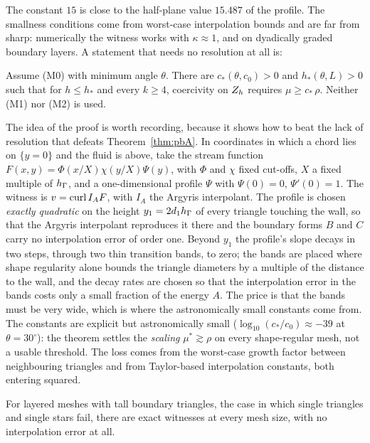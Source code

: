The constant $15$ is close to the half-plane value $15.487$ of the profile. The smallness conditions come from worst-case interpolation bounds and are far from sharp: numerically the witness works with $\kappa\approx1$, and on dyadically graded boundary layers. A statement that needs no resolution at all is:

\begin{theorem}\label{thm:pbM0}
Assume (M0) with minimum angle $\theta$. There are $c_\ast(\theta,c_0)>0$ and $h_\ast(\theta,L)>0$ such that for $h\le h_\ast$ and every $k\ge4$, coercivity on $Z_h$ requires $\mu\ge c_\ast\,\rho$. Neither (M1) nor (M2) is used.
\end{theorem}

The idea of the proof is worth recording, because it shows how to beat the lack of resolution that defeats Theorem~\ref{thm:pbA}. In coordinates in which a chord lies on $\{y=0\}$ and the fluid is above, take the stream function $F(x,y)=\Phi(x/X)\chi(y/X)\Psi(y)$, with $\Phi$ and $\chi$ fixed cut-offs, $X$ a fixed multiple of $h_\Gamma$, and a one-dimensional profile $\Psi$ with $\Psi(0)=0$, $\Psi'(0)=1$. The witness is $v=\operatorname{curl} I_AF$, with $I_A$ the Argyris interpolant. The profile is chosen \emph{exactly quadratic} on the height $y_1=2d_1h_\Gamma$ of every triangle touching the wall, so that the Argyris interpolant reproduces it there and the boundary forms $B$ and $C$ carry no interpolation error of order one. Beyond $y_1$ the profile's slope decays in two steps, through two thin transition bands, to zero; the bands are placed where shape regularity alone bounds the triangle diameters by a multiple of the distance to the wall, and the decay rates are chosen so that the interpolation error in the bands costs only a small fraction of the energy $A$. The price is that the bands must be very wide, which is where the astronomically small constants come from. The constants are explicit but astronomically small ($\log_{10}(c_\ast/c_0)\approx-39$ at $\theta=30^\circ$): the theorem settles the \emph{scaling} $\mu^\ast\gtrsim\rho$ on every shape-regular mesh, not a usable threshold. The loss comes from the worst-case growth factor between neighbouring triangles and from Taylor-based interpolation constants, both entering squared.

For layered meshes with tall boundary triangles, the case in which single triangles and single stars fail, there are exact witnesses at every mesh size, with no interpolation error at all.

